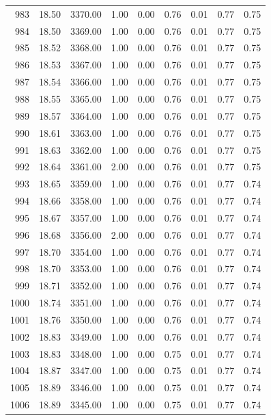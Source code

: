\documentclass{article}\usepackage[]{graphicx}\usepackage[]{color}
\begin{document}
\begin{longtable}{rrrrrrrrr}
  983 & 18.50 & 3370.00 & 1.00 & 0.00 & 0.76 & 0.01 & 0.77 & 0.75 \\ 
  984 & 18.50 & 3369.00 & 1.00 & 0.00 & 0.76 & 0.01 & 0.77 & 0.75 \\ 
  985 & 18.52 & 3368.00 & 1.00 & 0.00 & 0.76 & 0.01 & 0.77 & 0.75 \\ 
  986 & 18.53 & 3367.00 & 1.00 & 0.00 & 0.76 & 0.01 & 0.77 & 0.75 \\ 
  987 & 18.54 & 3366.00 & 1.00 & 0.00 & 0.76 & 0.01 & 0.77 & 0.75 \\ 
  988 & 18.55 & 3365.00 & 1.00 & 0.00 & 0.76 & 0.01 & 0.77 & 0.75 \\ 
  989 & 18.57 & 3364.00 & 1.00 & 0.00 & 0.76 & 0.01 & 0.77 & 0.75 \\ 
  990 & 18.61 & 3363.00 & 1.00 & 0.00 & 0.76 & 0.01 & 0.77 & 0.75 \\ 
  991 & 18.63 & 3362.00 & 1.00 & 0.00 & 0.76 & 0.01 & 0.77 & 0.75 \\ 
  992 & 18.64 & 3361.00 & 2.00 & 0.00 & 0.76 & 0.01 & 0.77 & 0.75 \\ 
  993 & 18.65 & 3359.00 & 1.00 & 0.00 & 0.76 & 0.01 & 0.77 & 0.74 \\ 
  994 & 18.66 & 3358.00 & 1.00 & 0.00 & 0.76 & 0.01 & 0.77 & 0.74 \\ 
  995 & 18.67 & 3357.00 & 1.00 & 0.00 & 0.76 & 0.01 & 0.77 & 0.74 \\ 
  996 & 18.68 & 3356.00 & 2.00 & 0.00 & 0.76 & 0.01 & 0.77 & 0.74 \\ 
  997 & 18.70 & 3354.00 & 1.00 & 0.00 & 0.76 & 0.01 & 0.77 & 0.74 \\ 
  998 & 18.70 & 3353.00 & 1.00 & 0.00 & 0.76 & 0.01 & 0.77 & 0.74 \\ 
  999 & 18.71 & 3352.00 & 1.00 & 0.00 & 0.76 & 0.01 & 0.77 & 0.74 \\ 
  1000 & 18.74 & 3351.00 & 1.00 & 0.00 & 0.76 & 0.01 & 0.77 & 0.74 \\ 
  1001 & 18.76 & 3350.00 & 1.00 & 0.00 & 0.76 & 0.01 & 0.77 & 0.74 \\ 
  1002 & 18.83 & 3349.00 & 1.00 & 0.00 & 0.76 & 0.01 & 0.77 & 0.74 \\ 
  1003 & 18.83 & 3348.00 & 1.00 & 0.00 & 0.75 & 0.01 & 0.77 & 0.74 \\ 
  1004 & 18.87 & 3347.00 & 1.00 & 0.00 & 0.75 & 0.01 & 0.77 & 0.74 \\ 
  1005 & 18.89 & 3346.00 & 1.00 & 0.00 & 0.75 & 0.01 & 0.77 & 0.74 \\ 
  1006 & 18.89 & 3345.00 & 1.00 & 0.00 & 0.75 & 0.01 & 0.77 & 0.74 \\ 

\end{longtable}
\end{document}
